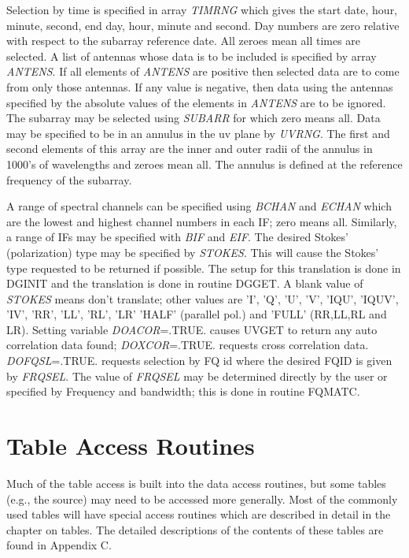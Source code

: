    Selection by time is specified in array {\it TIMRNG} which gives
the start date, hour, minute, second, end day, hour, minute and second.
Day numbers are zero relative with respect to the subarray reference
date.  All zeroes mean all times are selected.  A list of antennas
whose data is to be included is specified by array {\it ANTENS}.  If
all elements of {\it ANTENS} are positive then selected data are to
come from only those antennas.  If any value is negative, then data
using the antennas specified by the absolute values of the elements in
{\it ANTENS} are to be ignored.  The subarray may be selected using
{\it SUBARR} for which zero means all.  Data may be specified to be in
an annulus in the uv plane by {\it UVRNG}.  The first and second
elements of this array are the inner and outer radii of the annulus in
1000's of wavelengths and zeroes mean all.  The annulus is defined at
the reference frequency of the subarray.

   A range of spectral channels can be specified using {\it BCHAN} and
{\it ECHAN} which are the lowest and highest channel numbers in each
IF; zero means all.  Similarly, a range of IFs may be specified with
{\it BIF} and {\it EIF}.  The desired Stokes' (polarization) type may
be specified by {\it STOKES}.  This will cause the Stokes' type
requested to be returned if possible.  The setup for this translation
is done in DGINIT and the translation is done in
routine DGGET.  A blank value of {\it STOKES} means don't
translate; other values are 'I', 'Q', 'U', 'V', 'IQU', 'IQUV', 'IV',
'RR', 'LL', 'RL', 'LR' 'HALF' (parallel pol.) and 'FULL' (RR,LL,RL and
LR).  Setting variable {\it DOACOR}=.TRUE. causes UVGET
to return any auto correlation data found; {\it DOXCOR}=.TRUE. requests
cross correlation data.  {\it DOFQSL}=.TRUE. requests selection by
FQ id where the desired FQID is given by {\it FRQSEL}.  The value of
{\it FRQSEL} may be determined directly by the user or specified by
Frequency and bandwidth;  this is done in routine FQMATC.

\section{Table Access Routines }
Much of the table access is built into the data access routines, but
some tables (e.g., the source) may need to be accessed more generally.
Most of the commonly used tables will have special access routines
which are described in detail in the chapter on tables. The detailed
descriptions of the contents of these tables are found in Appendix C.

